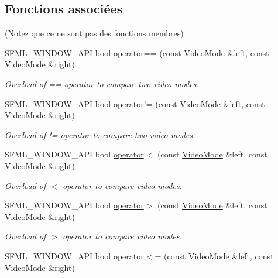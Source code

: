 \subsection*{Fonctions associées}
(Notez que ce ne sont pas des fonctions membres) \begin{DoxyCompactItemize}
\item 
S\+F\+M\+L\+\_\+\+W\+I\+N\+D\+O\+W\+\_\+\+A\+PI bool \hyperlink{classsf_1_1VideoMode_a03c51c119811ffd4403c6e2bcbd4ceaf}{operator==} (const \hyperlink{classsf_1_1VideoMode}{Video\+Mode} \&left, const \hyperlink{classsf_1_1VideoMode}{Video\+Mode} \&right)
\begin{DoxyCompactList}\small\item\em Overload of == operator to compare two video modes. \end{DoxyCompactList}\item 
S\+F\+M\+L\+\_\+\+W\+I\+N\+D\+O\+W\+\_\+\+A\+PI bool \hyperlink{classsf_1_1VideoMode_abd7bf172d318085ea572b8c10033f7b7}{operator!=} (const \hyperlink{classsf_1_1VideoMode}{Video\+Mode} \&left, const \hyperlink{classsf_1_1VideoMode}{Video\+Mode} \&right)
\begin{DoxyCompactList}\small\item\em Overload of != operator to compare two video modes. \end{DoxyCompactList}\item 
S\+F\+M\+L\+\_\+\+W\+I\+N\+D\+O\+W\+\_\+\+A\+PI bool \hyperlink{classsf_1_1VideoMode_a8e3d8fa57fa10dca05edbc34c4e2f1a8}{operator$<$} (const \hyperlink{classsf_1_1VideoMode}{Video\+Mode} \&left, const \hyperlink{classsf_1_1VideoMode}{Video\+Mode} \&right)
\begin{DoxyCompactList}\small\item\em Overload of $<$ operator to compare video modes. \end{DoxyCompactList}\item 
S\+F\+M\+L\+\_\+\+W\+I\+N\+D\+O\+W\+\_\+\+A\+PI bool \hyperlink{classsf_1_1VideoMode_ab6e5b2c65a428a4b56de8551b3706a36}{operator$>$} (const \hyperlink{classsf_1_1VideoMode}{Video\+Mode} \&left, const \hyperlink{classsf_1_1VideoMode}{Video\+Mode} \&right)
\begin{DoxyCompactList}\small\item\em Overload of $>$ operator to compare video modes. \end{DoxyCompactList}\item 
S\+F\+M\+L\+\_\+\+W\+I\+N\+D\+O\+W\+\_\+\+A\+PI bool \hyperlink{classsf_1_1VideoMode_a09b0a83f9135d934e540800bad12f0ca}{operator$<$=} (const \hyperlink{classsf_1_1VideoMode}{Video\+Mode} \&left, const \hyperlink{classsf_1_1VideoMode}{Video\+Mode} \&right)

\end{DoxyCompactItemize}
